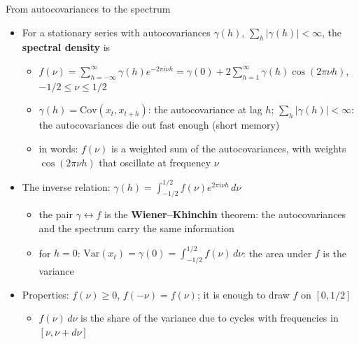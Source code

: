 \begin{frame}{From autocovariances to the spectrum}
\itemsize{\footnotesize}
\begin{itemize}
    \item For a stationary series with autocovariances $\gamma(h)$, $\sum_h|\gamma(h)| < \infty$, the \textbf{spectral density} is
    \begin{itemize}
        \item $f(\nu) = \sum_{h=-\infty}^{\infty}\gamma(h)e^{-2\pi i\nu h} = \gamma(0) + 2\sum_{h=1}^{\infty}\gamma(h)\cos(2\pi\nu h)$, $-1/2 \le \nu \le 1/2$
        \item $\gamma(h) = \mathrm{Cov}(x_t, x_{t+h})$: the autocovariance at lag $h$; $\sum_h|\gamma(h)| < \infty$: the autocovariances die out fast enough (short memory)
        \item in words: $f(\nu)$ is a weighted sum of the autocovariances, with weights $\cos(2\pi\nu h)$ that oscillate at frequency $\nu$
    \end{itemize}
    \item The inverse relation: $\gamma(h) = \int_{-1/2}^{1/2} f(\nu)e^{2\pi i\nu h}\,d\nu$
    \begin{itemize}
        \item the pair $\gamma \leftrightarrow f$ is the \textbf{Wiener--Khinchin} theorem: the autocovariances and the spectrum carry the same information
        \item for $h = 0$: $\mathrm{Var}(x_t) = \gamma(0) = \int_{-1/2}^{1/2} f(\nu)\,d\nu$: the area under $f$ is the variance
    \end{itemize}
    \item Properties: $f(\nu) \ge 0$, $f(-\nu) = f(\nu)$; it is enough to draw $f$ on $[0, 1/2]$
    \begin{itemize}
        \item $f(\nu)\,d\nu$ is the share of the variance due to cycles with frequencies in $[\nu, \nu + d\nu]$
    \end{itemize}
\end{itemize}
\end{frame}

